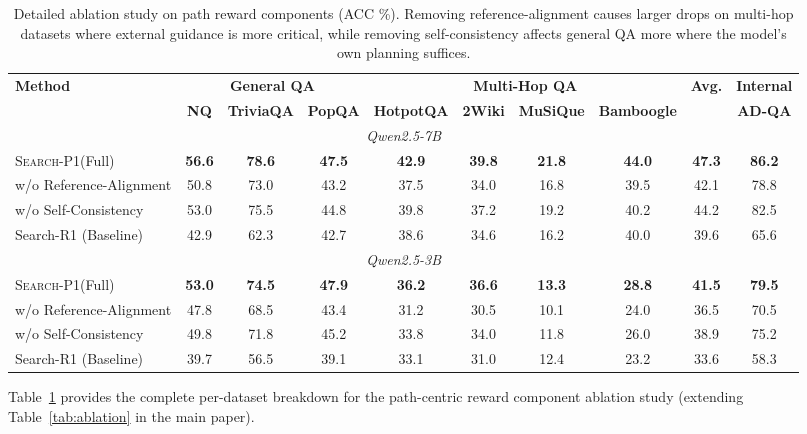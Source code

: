 \documentclass[11pt]{article}
\newcommand{\method}{\textsc{Search-P1}\xspace}
\begin{document}
\begin{table}[h]
\centering
\small
\begin{tabular}{l|ccc|cccc|c|c}
\toprule
\multirow{2}{*}{\textbf{Method}} & \multicolumn{3}{c|}{\textbf{General QA}} & \multicolumn{4}{c|}{\textbf{Multi-Hop QA}} & \multirow{2}{*}{\textbf{Avg.}} & \textbf{Internal} \\
& \textbf{NQ} & \textbf{TriviaQA} & \textbf{PopQA} & \textbf{HotpotQA} & \textbf{2Wiki} & \textbf{MuSiQue} & \textbf{Bamboogle} & & \textbf{AD-QA} \\
\midrule
\multicolumn{10}{c}{\textit{Qwen2.5-7B}} \\
\midrule
\method (Full) & \textbf{56.6} & \textbf{78.6} & \textbf{47.5} & \textbf{42.9} & \textbf{39.8} & \textbf{21.8} & \textbf{44.0} & \textbf{47.3} & \textbf{86.2} \\
\quad w/o Reference-Alignment & 50.8 & 73.0 & 43.2 & 37.5 & 34.0 & 16.8 & 39.5 & 42.1 & 78.8 \\
\quad w/o Self-Consistency & 53.0 & 75.5 & 44.8 & 39.8 & 37.2 & 19.2 & 40.2 & 44.2 & 82.5 \\
\midrule
Search-R1 (Baseline) & 42.9 & 62.3 & 42.7 & 38.6 & 34.6 & 16.2 & 40.0 & 39.6 & 65.6 \\
\midrule
\multicolumn{10}{c}{\textit{Qwen2.5-3B}} \\
\midrule
\method (Full) & \textbf{53.0} & \textbf{74.5} & \textbf{47.9} & \textbf{36.2} & \textbf{36.6} & \textbf{13.3} & \textbf{28.8} & \textbf{41.5} & \textbf{79.5} \\
\quad w/o Reference-Alignment & 47.8 & 68.5 & 43.4 & 31.2 & 30.5 & 10.1 & 24.0 & 36.5 & 70.5 \\
\quad w/o Self-Consistency & 49.8 & 71.8 & 45.2 & 33.8 & 34.0 & 11.8 & 26.0 & 38.9 & 75.2 \\
\midrule
Search-R1 (Baseline) & 39.7 & 56.5 & 39.1 & 33.1 & 31.0 & 12.4 & 23.2 & 33.6 & 58.3 \\
\bottomrule
\end{tabular}
\caption{Detailed ablation study on path reward components (ACC \%). Removing reference-alignment causes larger drops on multi-hop datasets where external guidance is more critical, while removing self-consistency affects general QA more where the model's own planning suffices.}
\label{tab:ablation_detailed}
\end{table}

Table~\ref{tab:ablation_detailed} provides the complete per-dataset breakdown for the path-centric reward component ablation study (extending Table~\ref{tab:ablation} in the main paper).
\end{document}
